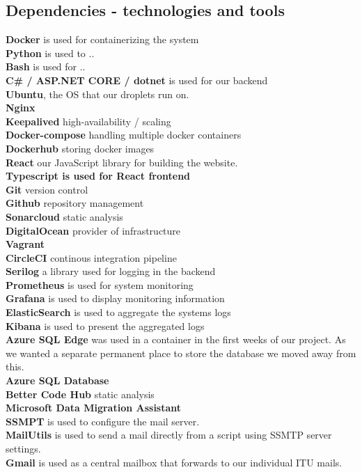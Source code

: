 \newpage
\subsection{Dependencies - technologies and tools}

\textbf{Docker} is used for containerizing the system \\
\textbf{Python} is used to .. \\
\textbf{Bash} is used for .. \\
\textbf{C\# / ASP.NET CORE / dotnet} is used for our backend \\
\textbf{Ubuntu}, the OS that our droplets run on.\\
\textbf{Nginx} \\
\textbf{Keepalived} high-availability / scaling \\
\textbf{Docker-compose} handling multiple docker containers \\
\textbf{Dockerhub} storing docker images \\
\textbf{React} our JavaScript library for building the website. \\
\textbf{Typescript is used for React frontend} \\
\textbf{Git} version control \\
\textbf{Github} repository management \\
\textbf{Sonarcloud} static analysis \\
\textbf{DigitalOcean} provider of infrastructure \\
\textbf{Vagrant} \\
\textbf{CircleCI} continous integration pipeline \\
\textbf{Serilog} a library used for logging in the backend \\
\textbf{Prometheus} is used for system monitoring \\
\textbf{Grafana} is used to display monitoring information \\
\textbf{ElasticSearch} is used to aggregate the systems logs \\
\textbf{Kibana} is used to present the aggregated logs \\
\textbf{Azure SQL Edge} was used in a container in the first weeks of our project. As we wanted a separate permanent place to store the database we moved away from this.\\
\textbf{Azure SQL Database} \\
\textbf{Better Code Hub} static analysis \\
\textbf{Microsoft Data Migration Assistant} \\
\textbf{SSMPT} is used to configure the mail server.\\
\textbf{MailUtils} is used to send a mail directly from a script using SSMTP server settings.\\
\textbf{Gmail} is used as a central mailbox that forwards to our individual ITU mails.\\



